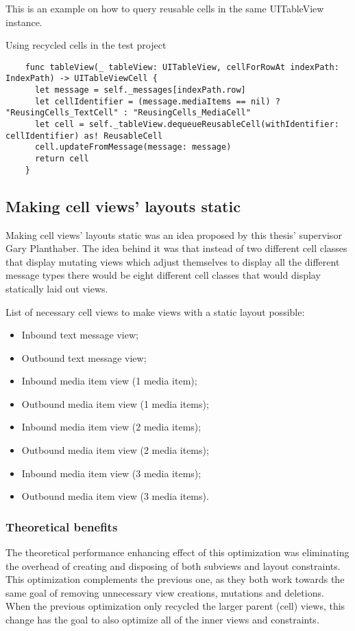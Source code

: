 \documentclass[a4paper,12pt]{article}
\begin{document}
This is an example on how to query reusable cells in the same UITableView instance.
\begin{listing}[H]
  \caption{Using recycled cells in the test project}
  \begin{verbatim}
    func tableView(_ tableView: UITableView, cellForRowAt indexPath: IndexPath) -> UITableViewCell {
      let message = self._messages[indexPath.row]
      let cellIdentifier = (message.mediaItems == nil) ? "ReusingCells_TextCell" : "ReusingCells_MediaCell"
      let cell = self._tableView.dequeueReusableCell(withIdentifier: cellIdentifier) as! ReusableCell
      cell.updateFromMessage(message: message)
      return cell
    }
  \end{verbatim}
\end{listing}

\subsection{Making cell views' layouts static}
Making cell views' layouts static was an idea proposed by this thesis' supervisor Gary Planthaber. The idea behind it was that instead of two different cell classes that display mutating views which adjust themselves to display all the different message types there would be eight different cell classes that would display statically laid out views.

List of necessary cell views to make views with a static layout possible:
\begin{itemize}
  \item Inbound text message view;
  \item Outbound text message view;
  \item Inbound media item view (1 media item);
  \item Outbound media item view (1 media items);
  \item Inbound media item view (2 media items);
  \item Outbound media item view (2 media items);
  \item Inbound media item view (3 media items);
  \item Outbound media item view (3 media items).
\end{itemize}

\subsubsection{Theoretical benefits}
The theoretical performance enhancing effect of this optimization was eliminating the overhead of creating and disposing of both subviews and layout constraints. This optimization complements the previous one, as they both work towards the same goal of removing unnecessary view creations, mutations and deletions. When the previous optimization only recycled the larger parent (cell) views, this change has the goal to also optimize all of the inner views and constraints.
\end{document}
